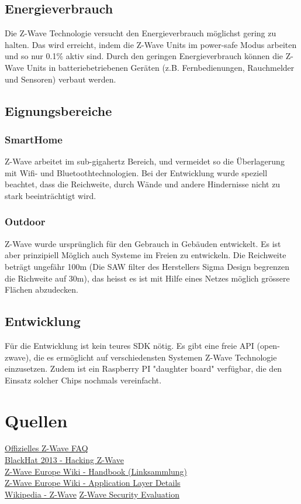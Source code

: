 \documentclass[a4paper,11pt]{article}
\begin{document}
\subsection*{Energieverbrauch}
Die Z-Wave Technologie versucht den Energieverbrauch möglichst gering zu halten. Das wird erreicht, indem die Z-Wave Units im power-safe Modus arbeiten und so nur 0.1\% aktiv sind. Durch den geringen Energieverbrauch können die Z-Wave Units in batteriebetriebenen Geräten (z.B. Fernbedienungen, Rauchmelder und Sensoren) verbaut werden.

\subsection*{Eignungsbereiche}
\subsubsection*{SmartHome}
Z-Wave arbeitet im sub-gigahertz Bereich, und vermeidet so die Überlagerung mit Wifi- und Bluetoothtechnologien. Bei der Entwicklung wurde speziell beachtet, dass die Reichweite, durch Wände und andere Hindernisse nicht zu stark beeinträchtigt wird.

\subsubsection*{Outdoor}
Z-Wave wurde ursprünglich für den Gebrauch in Gebäuden entwickelt. Es ist aber prinzipiell Möglich auch Systeme im Freien zu entwickeln. Die Reichweite beträgt ungefähr 100m (Die SAW filter des Herstellers Sigma Design begrenzen die Richweite auf 30m), das heisst es ist mit Hilfe eines Netzes möglich grössere Flächen abzudecken.

\subsection*{Entwicklung}
Für die Entwicklung ist kein teures SDK nötig. Es gibt eine freie API (open-zwave), die es ermöglicht auf verschiedensten Systemen Z-Wave Technologie einzusetzen. Zudem ist ein Raspberry PI "daughter board" verfügbar, die den Einsatz solcher Chips nochmals vereinfacht.

\section*{Quellen}

\href{http://www.z-wave.com/faq}{Offizielles Z-Wave FAQ}\\
\href{https://www.youtube.com/watch?v=KYaEQhvodc8}{BlackHat 2013 - Hacking Z-Wave}\\
\href{http://wiki.zwaveeurope.com/index.php?title=Z-Wave_Technical_Handbook}{Z-Wave Europe Wiki - Handbook (Linksammlung)}\\
\href{http://wiki.zwaveeurope.com/index.php?title=Z-Wave_Application_Layer}{Z-Wave Europe Wiki - Application Layer Details}\\
\href{https://en.wikipedia.org/wiki/Z-Wave}{Wikipedia - Z-Wave}
\href{https://www.sensepost.com/cms/resources/conferences/2013/bh_zwave/Security\%20Evaluation\%20of\%20Z-Wave_WP.pdf}{Z-Wave Security Evaluation}
\end{document}
